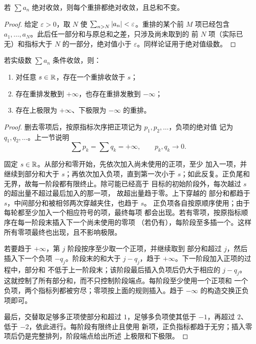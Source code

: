 \begin{theorem}[绝对收敛级数的重排不变性]
\label{thm:absolute-rearrangement-invariance}
若 \(\sum a_n\) 绝对收敛，则每个重排都绝对收敛，且总和不变。
\end{theorem}

\begin{proof}
给定 \(\varepsilon>0\)，取 \(N\) 使
\(\sum_{n>N}\left|a_n\right|<\varepsilon\)。重排的某个前 \(M\) 项已经包含
\(a_1,\ldots,a_N\)。此后任一部分和与原总和之差，只涉及尚未取到的
前 \(N\) 项（实际已无）和指标大于 \(N\) 的一部分，绝对值小于
\(\varepsilon\)。同样论证用于绝对值级数。
\end{proof}

\begin{theorem}
\label{thm:riemann-rearrangement}
若实级数 \(\sum a_n\) 条件收敛，则：

\begin{enumerate}
 \item 对任意 \(s\in\mathbb{R}\)，存在一个重排收敛于 \(s\)；
 \item 存在重排发散到 \(+\infty\)，也存在重排发散到 \(-\infty\)；
 \item 存在上极限为 \(+\infty\)、下极限为 \(-\infty\) 的重排。
\end{enumerate}
\end{theorem}

\begin{proof}
删去零项后，按原指标次序把正项记为 \(p_1,p_2,\ldots\)，负项的绝对值
记为 \(q_1,q_2,\ldots\)。上一节说明
\[
 \sum p_k=\sum q_k=+\infty,
\qquad p_k,q_k\to0.
\]

固定 \(s\in\mathbb{R}\)。从部分和零开始，先依次加入尚未使用的正项，至少
加入一项，并继续到部分和大于 \(s\)；再依次加入负项，直到第一次小于
\(s\)；如此反复。正负尾和无界，故每一阶段都有限终止。除可能已经高于
目标的初始阶段外，每次越过 \(s\) 的超出量不超过最后加入的那一项，
故超出量趋于零。上下穿越的
部分和都趋于 \(s\)，中间部分和被相邻两次穿越夹住，也趋于 \(s\)。
正负项各自按原顺序使用；由于每轮都至少加入一个相应符号的项，最终每项
都会出现。若有零项，按原指标顺序在每一阶段末插入下一个尚未使用的零项
（若仍有），每阶段至多插一个。这样所有零项最终也出现，且不影响极限。

若要趋于 \(+\infty\)，第 \(j\) 阶段按序至少取一个正项，并继续取到
部分和超过 \(j\)，然后插入下一个负项 \(-q_j\)。阶段末的和大于
\(j-q_j\)，趋于 \(+\infty\)。下一阶段加入正项的过程中，部分和
不低于上一阶段末；该阶段最后插入负项后仍大于相应的 \(j-q_j\)。
这就控制了所有部分和，而不只控制阶段端点。每阶段至少使用一个正项和
一个负项，两个指标列都被穷尽；零项按上面的规则插入。趋于
\(-\infty\) 的构造交换正负项即可。

最后，交替取足够多正项使部分和超过 \(1\)，足够多负项使其低于
\(-1\)，再超过 \(2\)、低于 \(-2\)，依此进行。每阶段有限终止且使用
新项，正负指标都趋于无穷；插入零项后仍是完整排列，阶段端点给出所述
上极限和下极限。
\end{proof}


